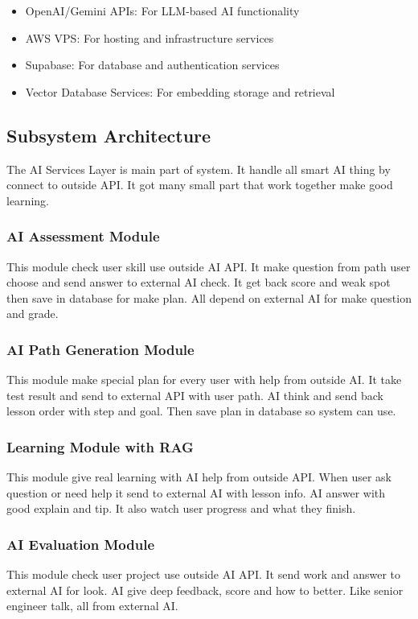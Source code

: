 \documentclass{FastFyp}
\begin{document}
\begin{itemize}
    \item OpenAI/Gemini APIs: For LLM-based AI functionality
    \item AWS VPS: For hosting and infrastructure services
    \item Supabase: For database and authentication services
    \item Vector Database Services: For embedding storage and retrieval
\end{itemize}


\subsection{Subsystem Architecture}
The AI Services Layer is main part of system. It handle all smart AI thing by connect to outside API. It got many small part that work together make good learning.

\subsubsection{AI Assessment Module}
This module check user skill use outside AI API. It make question from path user choose and send answer to external AI check. It get back score and weak spot then save in database for make plan. All depend on external AI for make question and grade.

\subsubsection{AI Path Generation Module}
This module make special plan for every user with help from outside AI. It take test result and send to external API with user path. AI think and send back lesson order with step and goal. Then save plan in database so system can use.

\subsubsection{Learning Module with RAG}
This module give real learning with AI help from outside API. When user ask question or need help it send to external AI with lesson info. AI answer with good explain and tip. It also watch user progress and what they finish.

\subsubsection{AI Evaluation Module}
This module check user project use outside AI API. It send work and answer to external AI for look. AI give deep feedback, score and how to better. Like senior engineer talk, all from external AI.
\end{document}
